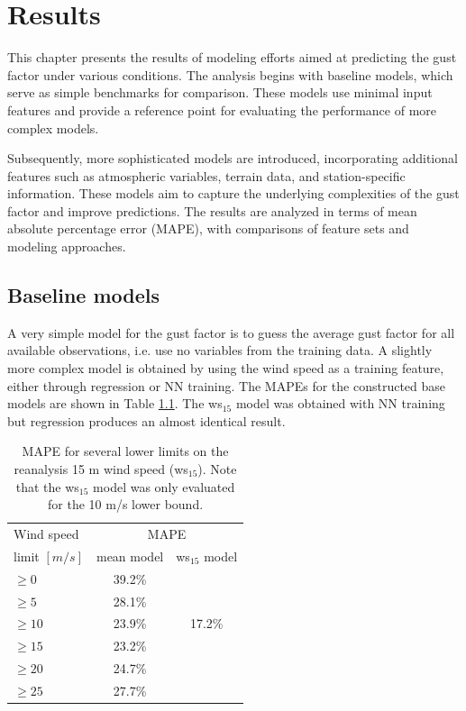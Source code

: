 \chapter{Results}
\label{Chapter3}
This chapter presents the results of modeling efforts aimed at predicting the gust factor under various conditions. The analysis begins with baseline models, which serve as simple benchmarks for comparison. These models use minimal input features and provide a reference point for evaluating the performance of more complex models.

Subsequently, more sophisticated models are introduced, incorporating additional features such as atmospheric variables, terrain data, and station-specific information. These models aim to capture the underlying complexities of the gust factor and improve predictions. The results are analyzed in terms of mean absolute percentage error (MAPE), with comparisons of feature sets and modeling approaches.

\section{Baseline models}
A very simple model for the gust factor is to guess the average gust factor for all available observations, i.e. use no variables from the training data. A slightly more complex model is obtained by using the wind speed as a training feature, either through regression or NN training. The MAPEs for the constructed base models are shown in Table \ref{table:baseline_models}. The ws$_{15}$ model was obtained with NN training but regression produces an almost identical result.

\begin{table}[h]
  \caption[MAPE for baseline models]{MAPE for several lower limits on the reanalysis 15 m wind speed (ws$_{15}$). Note that the ws$_{15}$ model was only evaluated for the 10 m/s lower bound.}
    \label{table:baseline_models}
    \centering
    \begin{tabular}{lcc}
        \toprule
        Wind speed & \multicolumn{2}{c}{MAPE}\\ 
        limit $[m/s]$ & mean model & ws$_{15}$ model\\
        \midrule
        $\geq 0$ & 39.2\%  & \\
        $\geq 5$ & 28.1\%  & \\
        $\geq 10$ & 23.9\% & 17.2\%\\
        $\geq 15$ & 23.2\% & \\
        $\geq 20$ & 24.7\% & \\
        $\geq 25$ & 27.7\% & \\
        \bottomrule
    \end{tabular}
\end{table}

